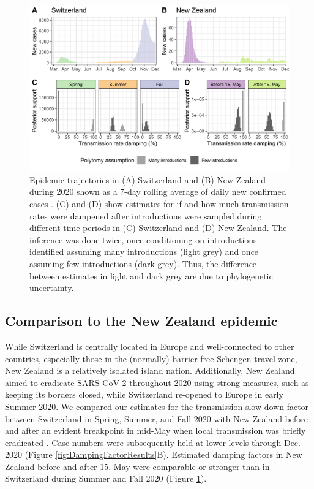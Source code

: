 \documentclass[9pt,twoside,lineno]{pnas-new} %
\begin{document}
\begin{figure}[h!]
\centering
\includegraphics[width=0.75\linewidth]{figures/contact_tracing_factors_no_sampUB_compared_to_cases.png}
\caption{Epidemic trajectories in (A) Switzerland and (B) New Zealand during 2020 shown as a 7-day rolling average of daily new confirmed cases \cite{Appel}. (C) and (D) show estimates for if and how much transmission rates were dampened after introductions were sampled during different time periods in (C) Switzerland and (D) New Zealand. The inference was done twice, once conditioning on introductions identified assuming many introductions (light grey) and once assuming few introductions (dark grey). Thus, the difference between estimates in light and dark grey are due to phylogenetic uncertainty.}  
\label{fig:scale-factor}
\end{figure}

\subsection{Comparison to the New Zealand epidemic}
While Switzerland is centrally located in Europe and well-connected to other countries, especially those in the (normally) barrier-free Schengen travel zone, New Zealand is a relatively isolated island nation. Additionally, New Zealand aimed to eradicate SARS-CoV-2 throughout 2020 using strong measures, such as keeping its borders closed, while Switzerland re-opened to Europe in early Summer 2020. We compared our estimates for the transmission slow-down factor between Switzerland in Spring, Summer, and Fall 2020 with New Zealand before and after an evident breakpoint in mid-May when local transmission was briefly eradicated \cite{Geoghegan2020}. Case numbers were subsequently held at lower levels through Dec. 2020 (Figure \ref{fig:DampingFactorResults}B). Estimated damping factors in New Zealand before and after 15. May were comparable or stronger than in Switzerland during Summer and Fall 2020 (Figure \ref{fig:scale-factor}).
\end{document}
